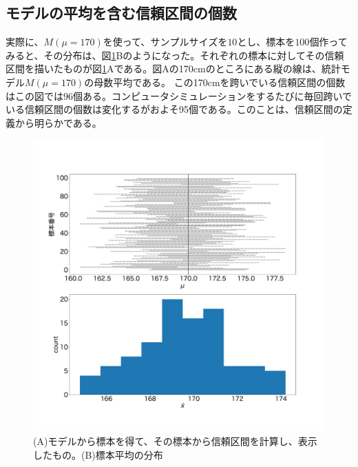 


\subsection{モデルの平均を含む信頼区間の個数}

実際に、$M(\mu=170)$を使って、$サンプルサイズを10$とし、標本を$100$個作ってみると、その分布は、図\ref{fig:confidence_interval_sample}Bのようになった。それぞれの標本に対してその信頼区間を描いたものが図\ref{fig:confidence_interval_sample}Aである。図Aの170cmのところにある縦の線は、統計モデル$M(\mu=170)$の母数平均である。
この170cmを跨いでいる信頼区間の個数はこの図では$96$個ある。コンピュータシミュレーションをするたびに毎回跨いでいる信頼区間の個数は変化するがおよそ95個である。このことは、信頼区間の定義から明らかである。


\begin{figure}
\begin{center}
    \includegraphics[width=15cm]{./image/03_/confidence_interval_model_count.pdf}
    \caption{(A)モデルから標本を得て、その標本から信頼区間を計算し、表示したもの。(B)標本平均の分布}
    \label{fig:confidence_interval_sample}
  \end{center}
\end{figure}


